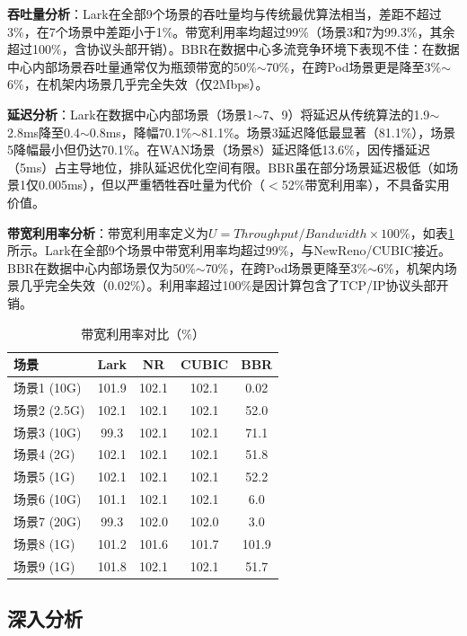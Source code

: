 \documentclass[10pt,twocolumn]{article}
\begin{document}
\textbf{吞吐量分析}：Lark在全部9个场景的吞吐量均与传统最优算法相当，差距不超过3\%，在7个场景中差距小于1\%。带宽利用率均超过99\%（场景3和7为99.3\%，其余超过100\%，含协议头部开销）。BBR在数据中心多流竞争环境下表现不佳：在数据中心内部场景吞吐量通常仅为瓶颈带宽的50\%$\sim$70\%，在跨Pod场景更是降至3\%$\sim$6\%，在机架内场景几乎完全失效（仅2Mbps）。

\textbf{延迟分析}：Lark在数据中心内部场景（场景1$\sim$7、9）将延迟从传统算法的1.9$\sim$2.8ms降至0.4$\sim$0.8ms，降幅70.1\%$\sim$81.1\%。场景3延迟降低最显著（81.1\%），场景5降幅最小但仍达70.1\%。在WAN场景（场景8）延迟降低13.6\%，因传播延迟（5ms）占主导地位，排队延迟优化空间有限。BBR虽在部分场景延迟极低（如场景1仅0.005ms），但以严重牺牲吞吐量为代价（$<$52\%带宽利用率），不具备实用价值。

\textbf{带宽利用率分析}：带宽利用率定义为$U = Throughput / Bandwidth \times 100\%$，如表\ref{tab:utilization}所示。Lark在全部9个场景中带宽利用率均超过99\%，与NewReno/CUBIC接近。BBR在数据中心内部场景仅为50\%$\sim$70\%，在跨Pod场景更降至3\%$\sim$6\%，机架内场景几乎完全失效（0.02\%）。利用率超过100\%是因计算包含了TCP/IP协议头部开销。

\begin{table}[htbp]
\centering
\caption{带宽利用率对比（\%）}
\label{tab:utilization}
\small
\begin{tabular}{lcccc}
\toprule
\textbf{场景} & \textbf{Lark} & \textbf{NR} & \textbf{CUBIC} & \textbf{BBR} \\
\midrule
场景1 (10G) & 101.9 & 102.1 & 102.1 & 0.02 \\
场景2 (2.5G) & 102.1 & 102.1 & 102.1 & 52.0 \\
场景3 (10G) & 99.3 & 102.1 & 102.1 & 71.1 \\
场景4 (2G) & 102.1 & 102.1 & 102.1 & 51.8 \\
场景5 (1G) & 102.1 & 102.1 & 102.1 & 52.2 \\
场景6 (10G) & 101.1 & 102.1 & 102.1 & 6.0 \\
场景7 (20G) & 99.3 & 102.0 & 102.0 & 3.0 \\
场景8 (1G) & 101.2 & 101.6 & 101.7 & 101.9 \\
场景9 (1G) & 101.8 & 102.1 & 102.1 & 51.7 \\
\bottomrule
\end{tabular}
\end{table}

\subsection{深入分析}
\end{document}
